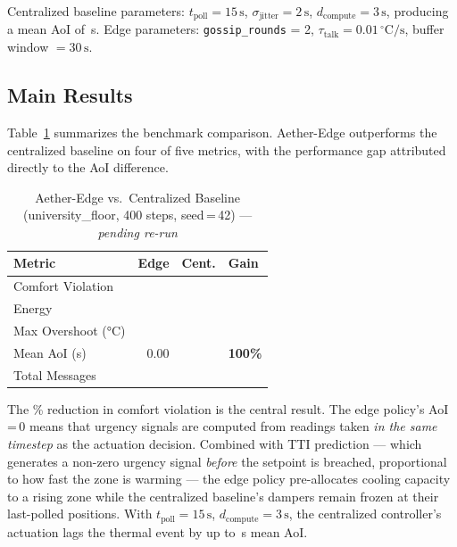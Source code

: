 \documentclass[conference]{IEEEtran}
\begin{document}
Centralized baseline parameters: $t_{\text{poll}} = 15\,\text{s}$,
$\sigma_{\text{jitter}} = 2\,\text{s}$, $d_{\text{compute}} = 3\,\text{s}$,
producing a mean AoI of \,s.  Edge parameters:
\texttt{gossip\_rounds} = 2, $\tau_{\text{talk}} = 0.01\,^\circ\text{C/s}$,
buffer window $= 30\,\text{s}$.

\subsection{Main Results}

Table~\ref{tab:results} summarizes the benchmark comparison.  Aether-Edge
outperforms the centralized baseline on four of five metrics, with the
performance gap attributed directly to the AoI difference.

\begin{table}[t]
\centering
\caption{Aether-Edge vs.\ Centralized Baseline
         (university\_floor, 400 steps, seed\,=\,42) --- \emph{pending re-run}}
\label{tab:results}
\begin{tabular}{lrrl}
\toprule
\textbf{Metric} & \textbf{Edge} & \textbf{Cent.} & \textbf{Gain} \\
\midrule
Comfort Violation  & \todo{--} & \todo{--} & \todo{--} \\
Energy             & \todo{--} & \todo{--} & \todo{--} \\
Max Overshoot (°C) & \todo{--} & \todo{--} & \todo{--} \\
Mean AoI (s)       & 0.00      & \todo{--} & \textbf{100\%} \\
Total Messages     & \todo{--} & \todo{--} & \todo{--} \\
\bottomrule
\end{tabular}
\end{table}

The \% reduction in comfort violation is the central result.  The
edge policy's AoI\,=\,0 means that urgency signals are computed from
readings taken \emph{in the same timestep} as the actuation decision.
Combined with TTI prediction — which generates a non-zero urgency signal
\emph{before} the setpoint is breached, proportional to how fast the zone
is warming — the edge policy pre-allocates cooling capacity to a rising zone
while the centralized baseline's dampers remain frozen at their
last-polled positions.  With $t_{\text{poll}} = 15\,\text{s}$,
$d_{\text{compute}} = 3\,\text{s}$, the centralized controller's actuation
lags the thermal event by up to \,s mean AoI.
\end{document}
